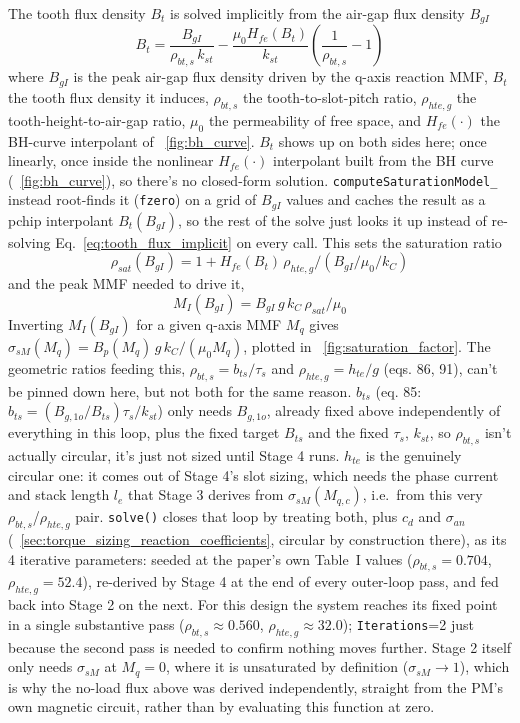 \documentclass[10pt,final,journal,a4paper,oneside,twocolumn]{IEEEtran}
\begin{document}
The tooth flux density $B_{t}$ is solved implicitly from the air-gap flux density $B_{gI}$
\begin{equation}
    \label{eq:tooth_flux_implicit}
    B_t = \frac{B_{gI}}{\rho_{bt,s}\,k_{st}} - \frac{\mu_0 H_{fe}(B_t)}{k_{st}}\left(\frac{1}{\rho_{bt,s}}-1\right)
\end{equation}
where $B_{gI}$ is the peak air-gap flux density driven by the q-axis reaction MMF, $B_t$ the tooth flux density it induces, $\rho_{bt,s}$ the tooth-to-slot-pitch ratio, $\rho_{hte,g}$ the tooth-height-to-air-gap ratio, $\mu_0$ the permeability of free space, and $H_{fe}(\cdot)$ the BH-curve interpolant of \figurename~\ref{fig:bh_curve}. $B_t$ shows up on both sides here; once linearly, once inside the nonlinear $H_{fe}(\cdot)$ interpolant built from the BH curve (\figurename~\ref{fig:bh_curve}), so there's no closed-form solution. \texttt{computeSaturationModel\_} instead root-finds it (\texttt{fzero}) on a grid of $B_{gI}$ values and caches the result as a pchip interpolant $B_t(B_{gI})$, so the rest of the solve just looks it up instead of re-solving Eq.~\ref{eq:tooth_flux_implicit} on every call. This sets the saturation ratio
\begin{equation*}
\rho_{sat}(B_{gI})=1+H_{fe}(B_t)\,\rho_{hte,g}/(B_{gI}/\mu_0/k_C)
\end{equation*}
and the peak MMF needed to drive it,
\begin{equation*}
M_I(B_{gI})=B_{gI}\,g\,k_C\,\rho_{sat}/\mu_0
\end{equation*}
Inverting $M_I(B_{gI})$ for a given q-axis MMF $M_q$ gives $\sigma_{sM}(M_q)=B_p(M_q)\,g\,k_C/(\mu_0 M_q)$, plotted in \figurename~\ref{fig:saturation_factor}. The geometric ratios feeding this, $\rho_{bt,s}=b_{ts}/\tau_s$ and $\rho_{hte,g}=h_{te}/g$ (eqs. 86, 91), can't be pinned down here, but not both for the same reason. $b_{ts}$ (eq. 85: $b_{ts}=(B_{g,1o}/B_{ts})\tau_s/k_{st}$) only needs $B_{g,1o}$, already fixed above independently of everything in this loop, plus the fixed target $B_{ts}$ and the fixed $\tau_s$, $k_{st}$, so $\rho_{bt,s}$ isn't actually circular, it's just not sized until Stage 4 runs. $h_{te}$ is the genuinely circular one: it comes out of Stage 4's slot sizing, which needs the phase current and stack length $l_e$ that Stage 3 derives from $\sigma_{sM}(M_{q,c})$, i.e.\ from this very $\rho_{bt,s}$/$\rho_{hte,g}$ pair. \texttt{solve()} closes that loop by treating both, plus $c_d$ and $\sigma_{an}$ (\sectionname~\ref{sec:torque_sizing_reaction_coefficients}, circular by construction there), as its 4 iterative parameters: seeded at the paper's own Table~I values ($\rho_{bt,s}=0.704$, $\rho_{hte,g}=52.4$), re-derived by Stage 4 at the end of every outer-loop pass, and fed back into Stage 2 on the next. For this design the system reaches its fixed point in a single substantive pass ($\rho_{bt,s}\approx0.560$, $\rho_{hte,g}\approx32.0$); \texttt{Iterations}=2 just because the second pass is needed to confirm nothing moves further. Stage 2 itself only needs $\sigma_{sM}$ at $M_q=0$, where it is unsaturated by definition ($\sigma_{sM}\to1$), which is why the no-load flux above was derived independently, straight from the PM's own magnetic circuit, rather than by evaluating this function at zero.
\end{document}
